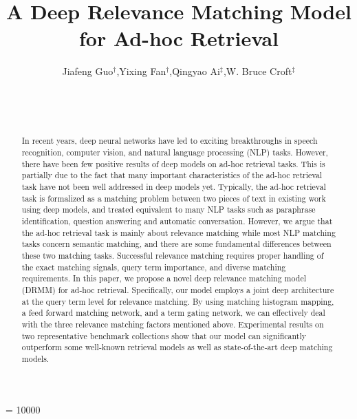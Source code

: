 \documentclass{sig-alternate-05-2015}
\begin{document}

\widowpenalty = 10000

\title{A Deep Relevance Matching Model for Ad-hoc Retrieval}

\author{
\alignauthor
Jiafeng Guo$^{\dagger}$,\hspace*{0.4cm}Yixing Fan$^{\dagger}$,\hspace*{0.4cm}Qingyao Ai$^{\ddagger}$,\hspace*{0.4cm}W. Bruce Croft$^{\ddagger}$\\
       \\
       \\
       \\
}

\maketitle
\begin{abstract}
In recent years, deep neural networks have led to exciting breakthroughs in speech recognition, computer vision, and natural language processing (NLP) tasks. However, there have been few positive results of deep models on ad-hoc retrieval tasks. This is partially due to the fact that many important characteristics of the ad-hoc retrieval task have not been well addressed in deep models yet. Typically, the ad-hoc retrieval task is formalized as a matching problem between two pieces of text in existing work using deep models, and treated equivalent to many NLP tasks such as paraphrase identification, question answering and automatic conversation. However, we argue that the ad-hoc retrieval task is mainly about relevance matching while most NLP matching tasks concern semantic matching, and there are some fundamental differences between these two matching tasks. Successful relevance matching requires proper handling of the exact matching signals, query term importance, and diverse matching requirements. In this paper, we propose a novel deep relevance matching model (DRMM) for ad-hoc retrieval. Specifically, our model employs a joint deep architecture at the query term level for relevance matching. By using matching histogram mapping, a feed forward matching network, and a term gating network, we can effectively deal with the three relevance matching factors mentioned above. Experimental results on two representative benchmark collections show that our model can significantly outperform some well-known retrieval models as well as state-of-the-art deep matching models.
\end{abstract}
\end{document}
